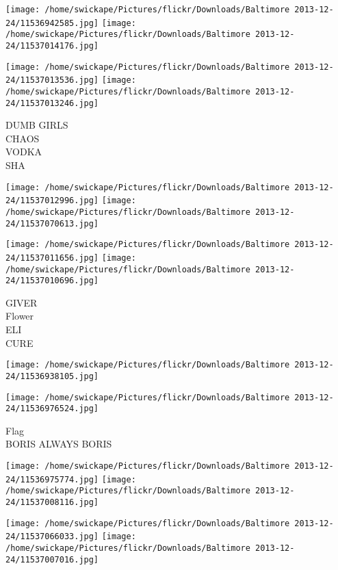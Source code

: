 \documentclass[10pt,letterpaper]{article}
\begin{document}
\texttt{[image: /home/swickape/Pictures/flickr/Downloads/Baltimore 2013-12-24/11536942585.jpg]}
\texttt{[image: /home/swickape/Pictures/flickr/Downloads/Baltimore 2013-12-24/11537014176.jpg]}

\texttt{[image: /home/swickape/Pictures/flickr/Downloads/Baltimore 2013-12-24/11537013536.jpg]}
\texttt{[image: /home/swickape/Pictures/flickr/Downloads/Baltimore 2013-12-24/11537013246.jpg]}

DUMB GIRLS\\
CHAOS\\
VODKA\\
SHA\\
\pagebreak

\texttt{[image: /home/swickape/Pictures/flickr/Downloads/Baltimore 2013-12-24/11537012996.jpg]}
\texttt{[image: /home/swickape/Pictures/flickr/Downloads/Baltimore 2013-12-24/11537070613.jpg]}

\texttt{[image: /home/swickape/Pictures/flickr/Downloads/Baltimore 2013-12-24/11537011656.jpg]}
\texttt{[image: /home/swickape/Pictures/flickr/Downloads/Baltimore 2013-12-24/11537010696.jpg]}

GIVER\\
Flower\\
ELI\\
CURE\\
\pagebreak

\texttt{[image: /home/swickape/Pictures/flickr/Downloads/Baltimore 2013-12-24/11536938105.jpg]}

\vspace{0.25in}
\texttt{[image: /home/swickape/Pictures/flickr/Downloads/Baltimore 2013-12-24/11536976524.jpg]}

Flag\\
BORIS ALWAYS BORIS\\
\pagebreak

\texttt{[image: /home/swickape/Pictures/flickr/Downloads/Baltimore 2013-12-24/11536975774.jpg]}
\texttt{[image: /home/swickape/Pictures/flickr/Downloads/Baltimore 2013-12-24/11537008116.jpg]}

\texttt{[image: /home/swickape/Pictures/flickr/Downloads/Baltimore 2013-12-24/11537066033.jpg]}
\texttt{[image: /home/swickape/Pictures/flickr/Downloads/Baltimore 2013-12-24/11537007016.jpg]}
\end{document}
